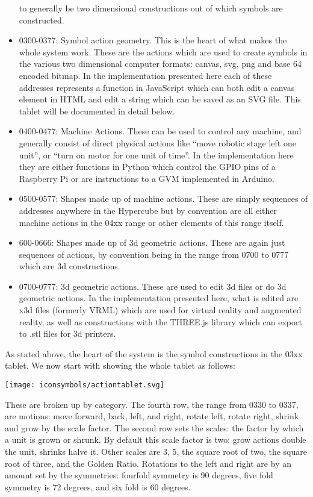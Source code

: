 \begin{itemize}
  to generally be two dimensional constructions out of which symbols are
  constructed.\\
\item
  0300-0377: Symbol action geometry. This is the heart of what makes the
  whole system work. These are the actions which are used to create
  symbols in the various two dimensional computer formats: canvas, svg,
  png and base 64 encoded bitmap. In the implementation presented here
  each of these addresses represents a function in JavaScript which can
  both edit a canvas element in HTML and edit a string which can be
  saved as an SVG file. This tablet will be documented in detail below.
\item
  0400-0477: Machine Actions. These can be used to control any machine,
  and generally consist of direct physical actions like ``move robotic
  stage left one unit'', or ``turn on motor for one unit of time''. In
  the implementation here they are either functions in Python which
  control the GPIO pins of a Raspberry Pi or are instructions to a GVM
  implemented in Arduino.\\
\item
  0500-0577: Shapes made up of machine actions. These are simply
  sequences of addresses anywhere in the Hypercube but by convention are
  all either machine actions in the 04xx range or other elements of this
  range itself.
\item
  600-0666: Shapes made up of 3d geometric actions. These are again just
  sequences of actions, by convention being in the range from 0700 to
  0777 which are 3d constructions.
\item
  0700-0777: 3d geometric actions. These are used to edit 3d files or do
  3d geometric actions. In the implementation presented here, what is
  edited are x3d files (formerly VRML) which are used for virtual
  reality and augmented reality, as well as constructions with the
  THREE.js library which can export to .stl files for 3d printers.
\end{itemize}

As stated above, the heart of the system is the symbol constructions in
the 03xx tablet. We now start with showing the whole tablet as follows:

\texttt{[image: iconsymbols/actiontablet.svg]}

These are broken up by category. The fourth row, the range from 0330 to
0337, are motions: move forward, back, left, and right, rotate left,
rotate right, shrink and grow by the scale factor. The second row sets
the scales: the factor by which a unit is grown or shrunk. By default
this scale factor is two: grow actions double the unit, shrinks halve
it. Other scales are 3, 5, the square root of two, the square root of
three, and the Golden Ratio. Rotations to the left and right are by an
amount set by the symmetries: fourfold symmetry is 90 degrees, five fold
symmetry is 72 degrees, and six fold is 60 degrees.

